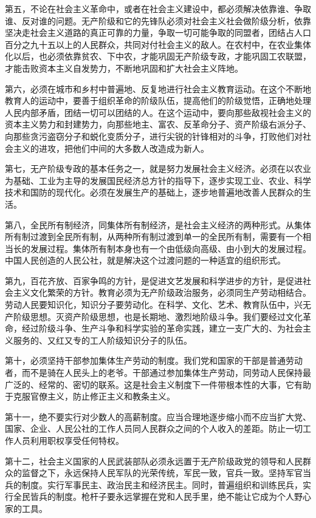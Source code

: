 第五，不论在社会主义革命中，或者在社会主义建设中，都必须解决依靠谁、争取谁、反对谁的问题。无产阶级和它的先锋队必须对社会主义社会做阶级分析，依靠坚决走社会主义道路的真正可靠的力量，争取一切可能争取的同盟者，团结占人口百分之九十五以上的人民群众，共同对付社会主义的敌人。在农村中，在农业集体化以后，也必须依靠贫农、下中农，才能巩固无产阶级专政，才能巩固工农联盟，才能击败资本主义自发势力，不断地巩固和扩大社会主义阵地。

第六，必须在城市和乡村中普遍地、反复地进行社会主义教育运动。在这个不断地教育人的运动中，要善于组织革命的阶级队伍，提高他们的阶级觉悟，正确地处理人民内部矛盾，团结一切可以团结的人。在这个运动中，要向那些敌视社会主义的资本主义势力和封建势力，向那些地主、富农、反革命分子、资产阶级右派分子、向那些贪污盗窃分子和蜕化变质分子，进行尖锐的针锋相对的斗争，打败他们对社会主义的进攻，把他们中间的大多数人改造成为新人。

第七，无产阶级专政的基本任务之一，就是努力发展社会主义经济。必须在以农业为基础、工业为主导的发展国民经济总方针的指导下，逐步实现工业、农业、科学技术和国防的现代化。必须在发展生产的基础上，逐步地普遍地改善人民群众的生活。

第八，全民所有制经济，同集体所有制经济，是社会主义经济的两种形式。从集体所有制过渡到全民所有制，从两种所有制过渡到单一的全民所有制，需要有一个相当长的发展过程。集体所有制本身也有一个由低级向高级、由小到大的发展过程。中国人民创造的人民公社，就是解决这个过渡问题的一种适宜的组织形式。

第九，百花齐放、百家争鸣的方针，是促进文艺发展和科学进步的方针，是促进社会主义文化繁荣的方针。教育必须为无产阶级政治服务，必须同生产劳动相结合。 劳动人民要知识化，知识分子要劳动化。在科学、文化、艺术、教育队伍中，兴无产阶级思想。灭资产阶级思想，也是长期地、激烈地阶级斗争。我们要经过文化革命，经过阶级斗争、生产斗争和科学实验的革命实践，建立一支广大的、为社会主义服务的、又红又专的工人阶级知识分子的队伍。

第十，必须坚持干部参加集体生产劳动的制度。我们党和国家的干部是普通劳动者，而不是骑在人民头上的老爷。干部通过参加集体生产劳动，同劳动人民保持最广泛的、经常的、密切的联系。这是社会主义制度下一件带根本性的大事，它有助于克服官僚主义，防止修正主义和教条主义。

第十一，绝不要实行对少数人的高薪制度。应当合理地逐步缩小而不应当扩大党、国家、企业、人民公社的工作人员同人民群众之间的个人收入的差距。防止一切工作人员利用职权享受任何特权。

第十二，社会主义国家的人民武装部队必须永远置于无产阶级政党的领导和人民群众的监督之下，永远保持人民军队的光荣传统，军民一致，官兵一致。坚持军官当兵的制度。实行军事民主、政治民主和经济民主。同时，普遍组织和训练民兵，实行全民皆兵的制度。枪杆子要永远掌握在党和人民手里，绝不能让它成为个人野心家的工具。

